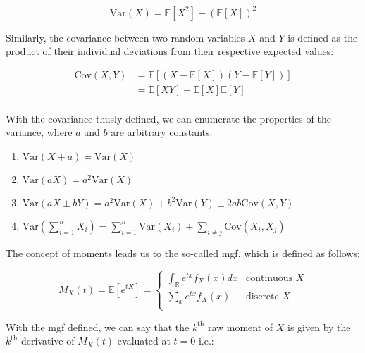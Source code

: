 \documentclass{report}
\begin{document}
\begin{equation}\label{eq:variance}
    \text{Var}(X) = \mathbb{E}\left[X^2\right] - \left(\mathbb{E}[X]\right)^2
\end{equation}

Similarly, the covariance between two random variables $X$ and $Y$ is defined as the product of their individual deviations from their respective expected values: 

\begin{equation}
    \begin{aligned}
        \text{Cov}(X, Y) 
          &= \mathbb{E}\left[(X - \mathbb{E}[X])(Y - \mathbb{E}[Y])\right] \\
          &= \mathbb{E}[XY] - \mathbb{E}[X]\mathbb{E}[Y] \\
    \end{aligned}
\end{equation}

With the covariance thusly defined, we can enumerate the properties of the variance, where $a$ and $b$ are arbitrary constants:

\begin{enumerate}
    \item $\text{Var}(X + a) = \text{Var}(X)$
    \item $\text{Var}(aX) = a^2\text{Var}(X)$
    \item $\text{Var}(aX \pm bY) = a^2\text{Var}(X) + b^2\text{Var}(Y) \pm 2ab\text{Cov}(X, Y)$
    \item $\text{Var}\left(\sum_{i=1}^n X_i\right) = \sum_{i=1}^n \text{Var}(X_i) + \sum_{i\neq j} \text{Cov}(X_i, X_j)$
\end{enumerate}

The concept of moments leads us to the so-called \gls{mgf}, which is defined as follows:

\begin{equation}\label{eq:mgf-1}
    M_X(t) = \mathbb{E}\left[e^{tX}\right] = \begin{cases}
        \int_{\mathbb{R}} e^{tx} f_X(x) dx & \text{continuous } X \\
        \sum_x e^{tx} f_X(x) & \text{discrete } X \\
    \end{cases}
\end{equation}

With the \gls{mgf} defined, we can say that the $k^{\text{th}}$ raw moment of $X$ is given by the $k^{\text{th}}$ derivative of $M_X(t)$ evaluated at $t = 0$ i.e.:
\end{document}
